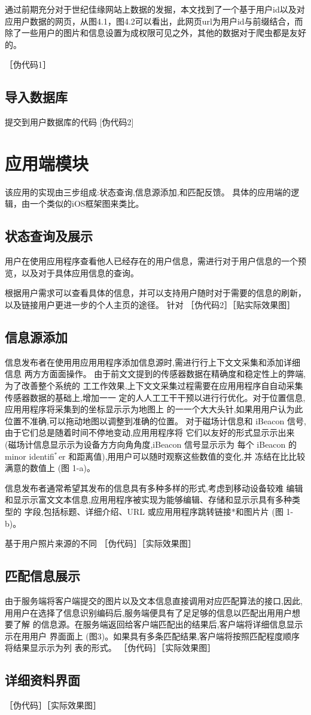 通过前期充分对于世纪佳缘网站上数据的发掘，本文找到了一个基于用户id以及对应用户数据的网页，从图4.1，图4.2可以看出，此网页url为用户id与前缀结合，而除了一些用户的图片和信息设置为成权限可见之外，其他的数据对于爬虫都是友好的。

［伪代码1］
\subsection{导入数据库}
提交到用户数据库的代码
[伪代码2]

\section{应用端模块}
该应用的实现由三步组成:状态查询,信息源添加,和匹配反馈。
具体的应用端的逻辑，由一个类似的iOS框架图来类比。

\subsection{状态查询及展示}
用户在使⽤应⽤程序查看他人已经存在的用户信息，需进行对于用户信息的一个预览，以及对于具体应用信息的查询。

根据用户需求可以查看具体的信息，并可以支持用户随时对于需要的信息的刷新，以及链接用户更进一步的个人主页的途径。
针对
［伪代码2］［贴实际效果图］
\subsection{信息源添加}
信息发布者在使⽤用应⽤用程序添加信息源时,需进⾏行上下⽂文采集和添加详细信息 两⽅方⾯面操作。
由于前⽂文提到的传感器数据在精确度和稳定性上的弊端,为了改善整个系统的 ⼯工作效果,上下⽂文采集过程需要在应⽤用程序⾃自动采集传感器数据的基础上,增加⼀一 定的⼈人⼯工⼲干预以进⾏行优化。对于位置信息,应⽤用程序将采集到的坐标显⽰示为地图上 的⼀一个⼤大头针,如果⽤用户认为此位置不准确,可以拖动地图以调整到准确的位置。 对于磁场计信息和 iBeacon 信号,由于它们总是随着时间不停地变动,应⽤用程序将 它们以友好的形式显⽰示出来 (磁场计信息显⽰示为设备⽅方向⾓角度,iBeacon 信号显⽰示为 每个 iBeacon 的 minor identiﬁﾞer 和距离值),⽤用户可以随时观察这些数值的变化,并 冻结在⽐比较满意的数值上 (图 1-a)。

信息发布者通常希望其发布的信息具有多种多样的形式,考虑到移动设备较难 编辑和显⽰示富⽂文本信息,应⽤用程序被实现为能够编辑、存储和显⽰示具有多种类型的 字段,包括标题、详细介绍、URL 或应⽤用程序跳转链接*和图⽚片 (图 1-b)。

基于用户照片来源的不同
［伪代码］［实际效果图］
\subsection{匹配信息展⽰}
由于服务端将客户端提交的图片以及文本信息直接调用对应匹配算法的接口,因此, ⽤用户在选择了信息识别编码后,服务端便具有了⾜足够的信息以匹配出⽤用户想要了解 的信息源。在服务端返回给客户端匹配出的结果后,客户端将详细信息显⽰示在⽤用户 界⾯面上 (图3)。如果具有多条匹配结果,客户端将按照匹配程度顺序将结果显⽰示为列 表的形式。
［伪代码］［实际效果图］
\subsection{详细资料界面}
［伪代码］［实际效果图］


\section{}






